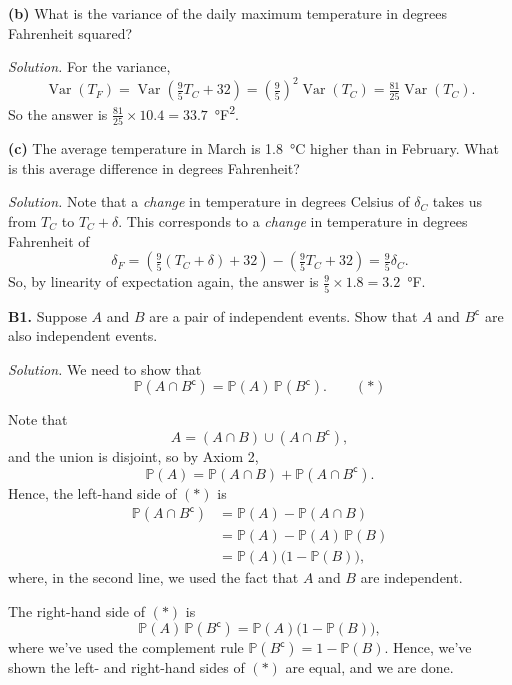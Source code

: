 \documentclass[
  a4paper,
]{book}
\theoremstyle{definition}
\theoremstyle{definition}
\theoremstyle{definition}
\theoremstyle{definition}
\theoremstyle{remark}
\begin{document}
\textbf{(b)} What is the variance of the daily maximum temperature in degrees Fahrenheit squared?

\begin{myanswers}
\emph{Solution.}
For the variance,
\[ \operatorname{Var}(T_F) = \operatorname{Var}\left(\tfrac95T_C + 32\right) = \left(\tfrac95\right)^2 \operatorname{Var}(T_C) = \tfrac{81}{25}\operatorname{Var}(T_C). \]
So the answer is \(\frac{81}{25} \times 10.4 = 33.7\)~°F\textsuperscript{2}.

\end{myanswers}

\textbf{(c)} The average temperature in March is 1.8~°C higher than in February. What is this average difference in degrees Fahrenheit?

\begin{myanswers}
\emph{Solution.}
Note that a \emph{change} in temperature in degrees Celsius of \(\delta_C\) takes us from \(T_C\) to \(T_C + \delta\). This corresponds to a \emph{change} in temperature in degrees Fahrenheit of
\[ \delta_F = \left(\tfrac95(T_C+\delta) + 32\right) - \left(\tfrac95T_C + 32\right) = \tfrac95\delta_C . \]
So, by linearity of expectation again, the answer is \(\frac95 \times 1.8 = 3.2\)~°F.

\end{myanswers}

\textbf{B1.} Suppose \(A\) and \(B\) are a pair of independent events. Show that \(A\) and \(B^\mathsf{c}\) are also independent events.

\begin{myanswers}
\emph{Solution.}
We need to show that
\[ \mathbb P(A \cap B^\mathsf{c}) = \mathbb P(A) \, \mathbb P(B^\mathsf{c}) . \qquad (*) \]

Note that
\[ A = (A \cap B) \cup (A \cap B^\mathsf{c}) , \]
and the union is disjoint, so by Axiom 2,
\[ \mathbb P(A) = \mathbb P(A \cap B) + \mathbb P(A \cap B^\mathsf{c}) . \]
Hence, the left-hand side of \((*)\) is
\begin{align*}
\mathbb P(A \cap B^\mathsf{c})
&= \mathbb P(A) - \mathbb P(A \cap B) \\
&= \mathbb P(A) - \mathbb P(A)\,\mathbb P(B) \\
&= \mathbb P(A) \big(1 - \mathbb P(B)\big) ,
\end{align*}
where, in the second line, we used the fact that \(A\) and \(B\) are independent.

The right-hand side of \((*)\) is
\[\mathbb P(A) \, \mathbb P(B^\mathsf{c}) = \mathbb P(A) \big(1 - \mathbb P(B)\big) , \]
where we've used the complement rule \(\mathbb P(B^\mathsf{c}) = 1- \mathbb P(B)\). Hence, we've shown the left- and right-hand sides of \((*)\) are equal, and we are done.

\end{myanswers}
\end{document}
